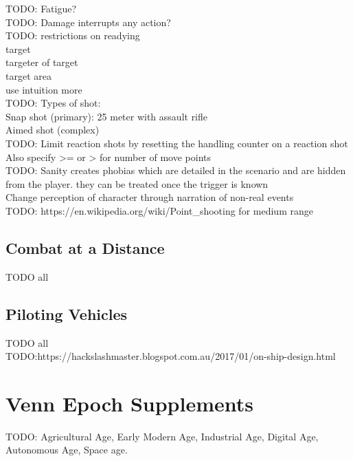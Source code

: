 \documentclass[letterpaper,titlepage,openany,twocolumn]{book}
\begin{document}
TODO: Fatigue?\\

TODO: Damage interrupts any action?\\

TODO: restrictions on readying\\
	target\\
	targeter of target\\
	target area\\
	use intuition more\\

TODO: Types of shot:\\
	Snap shot (primary): 25 meter with assault rifle\\
	Aimed shot (complex)\\

TODO: Limit reaction shots by resetting the handling counter on a reaction shot\\
	Also specify >= or > for number of move points\\

TODO: Sanity creates phobias which are detailed in the scenario and are hidden from the player. they can be treated once the trigger is known\\
	Change perception of character through narration of non-real events\\

TODO: https://en.wikipedia.org/wiki/Point\_shooting	for medium range\\

\chapter{Combat at a Distance}
TODO all\\

\chapter{Piloting Vehicles}
TODO all\\
TODO:https://hackslashmaster.blogspot.com.au/2017/01/on-ship-design.html\\

\part{Venn Epoch Supplements}
TODO: Agricultural Age, Early Modern Age, Industrial Age, Digital Age, Autonomous Age, Space age.\\
\end{document}
